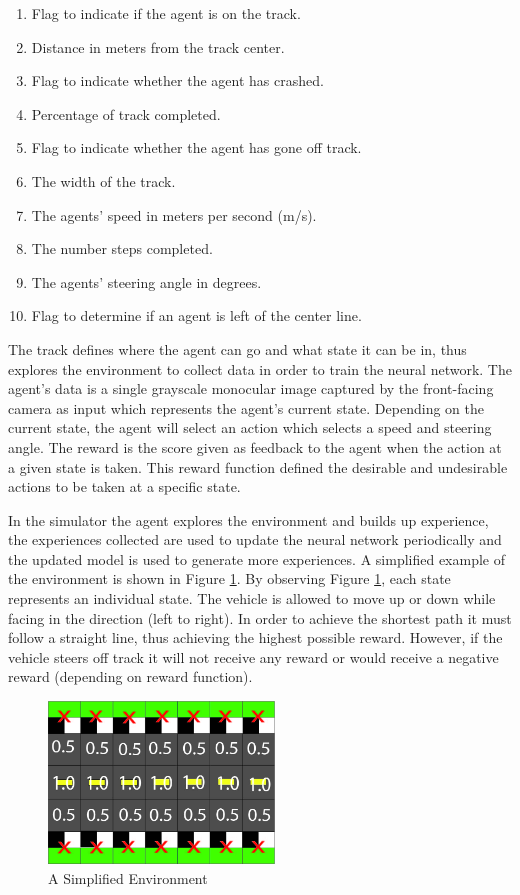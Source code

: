 \documentclass[journal]{IEEEtran}
\begin{document}
\begin{enumerate}
  \item Flag to indicate if the agent is on the track.
  \item Distance in meters from the track center.
  \item Flag to indicate whether the agent has crashed.
  \item Percentage of track completed.
  \item Flag to indicate whether the agent has gone off track.
  \item The width of the track.
  \item The agents’ speed in meters per second (m/s).
  \item The number steps completed.
  \item The agents’ steering angle in degrees.
  \item Flag to determine if an agent is left of the center line.
\end{enumerate}

The track defines where the agent can go and what state it can be in, thus explores the environment to collect data in order to train the neural network. The agent's data is a single grayscale monocular image captured by the front-facing camera as input which represents the agent's current state. Depending on the current state, the agent will select an action which selects a speed and steering angle. The reward is the score given as feedback to the agent when the action at a given state is taken.  This reward function defined the desirable and undesirable actions to be taken at a specific state. 

In the simulator the agent explores the environment and builds up experience, the experiences collected are used to update the neural network periodically and the updated model is used to generate more experiences.   A simplified example of the environment is shown in Figure \ref{simplifiedTrack}.  By observing Figure \ref{simplifiedTrack}, each state represents an individual state. The vehicle is allowed to move up or down while facing in the direction (left to right). In order to achieve the shortest path it must follow a straight line, thus achieving the highest possible reward.  However, if the vehicle steers off track it will not receive any reward or would receive a negative reward (depending on reward function).

\begin{figure}[htbp]
\begin{center}
\includegraphics[width=6cm]{AWS-simplifiedTrack}
\end{center}
\vspace{-2mm}
\caption{A Simplified Environment}
\label{simplifiedTrack}
\end{figure}
\end{document}
